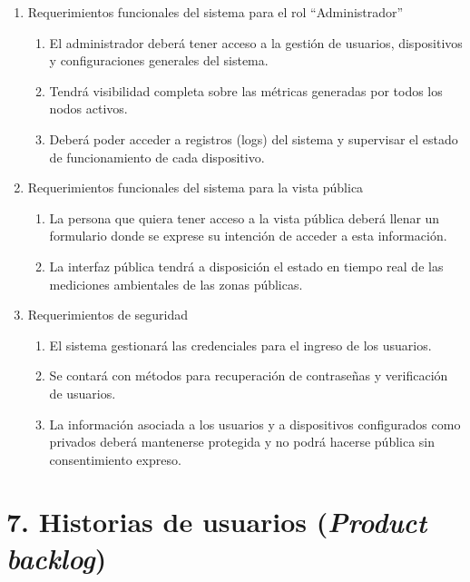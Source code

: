 \documentclass[
11pt, %
]{charter}
\begin{document}
\begin{enumerate}
\begin{enumerate}
	\end{enumerate}

	\item Requerimientos funcionales del sistema para el rol “Administrador”
	\begin{enumerate}
		\item El administrador deberá tener acceso a la gestión de usuarios, dispositivos y configuraciones generales del sistema.
		\item Tendrá visibilidad completa sobre las métricas generadas por todos los nodos activos.
		\item Deberá poder acceder a registros (logs) del sistema y supervisar el estado de funcionamiento de cada dispositivo.

	\end{enumerate}

	\item Requerimientos funcionales del sistema para la vista pública
	\begin{enumerate}
		\item La persona que quiera tener acceso a la vista pública deberá llenar un formulario donde se exprese su intención de acceder a esta información.
		\item La interfaz pública tendrá a disposición el estado en tiempo real de las mediciones ambientales de las zonas públicas.

	\end{enumerate}

	\item Requerimientos de seguridad
	\begin{enumerate}
		\item El sistema gestionará las credenciales para el ingreso de los usuarios.
		\item Se contará con métodos para recuperación de contraseñas y verificación de usuarios.
		\item La información asociada a los usuarios y a dispositivos configurados como privados deberá mantenerse protegida y no podrá hacerse pública sin consentimiento expreso.

	\end{enumerate}

\end{enumerate}

\section{7. Historias de usuarios (\textit{Product backlog})}
\label{sec:backlog}
\end{document}
